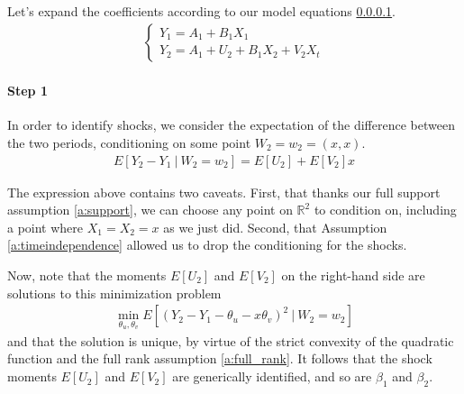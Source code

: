 Let's expand the coefficients according to our model equations \ref{}.
\begin{align}
  \begin{cases}
    Y_{1} = A_{1} + B_{1}X_{1} \\ 
    Y_{2} = A_{1} + U_{2} + B_{1}X_{2} + V_{2}X_{t} \label{eq:expanded}
  \end{cases}
\end{align}


\paragraph{Step 1} In order to identify shocks, we consider the expectation of the difference between the two periods, conditioning on some point $W_2 = w_2 = (x, x)$.
\begin{align}
  E[Y_{2} - Y_{1} \ | \  W_{2} = w_{2}] = 
  E[U_{2}] + E[V_{2}]x
\end{align}

\noindent The expression above contains two caveats. First, that thanks our full support assumption \ref{a:support}, we can choose any point on $\mathbb{R}^2$ to condition on, including a point where $X_1 = X_2 = x$ as we just did. Second, that Assumption \ref{a:timeindependence} allowed us to drop the conditioning for the shocks.

Now, note that the moments $E[U_2]$ and $E[V_2]$ on the right-hand side are solutions to this minimization problem
\begin{align}
  \min_{\theta_u, \theta_v}  
  E[(Y_{2} - Y_{1} - \theta_u -  x\theta_v)^2 \  | \ W_2 = w_2]
\end{align}
\noindent and that the solution is unique, by virtue of the strict convexity of the quadratic function and the full rank assumption \ref{a:full_rank}. It follows that the shock moments $E[U_2]$ and $E[V_2]$ are generically identified, and so are $\beta_1$ and $\beta_2$.


